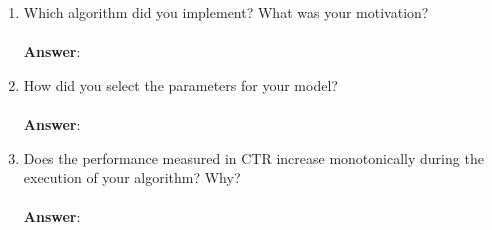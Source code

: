 \documentclass[11pt]{article}
\begin{document}
\begin{enumerate}
\item Which algorithm did you implement? What was your motivation? \\ \\
\textbf{Answer}:

\item How did you select the parameters for your model? \\ \\
\textbf{Answer}:

\item Does the performance measured in CTR increase monotonically during the
execution of your algorithm? Why? \\ \\
\textbf{Answer}:

\end{enumerate}
\end{document}
